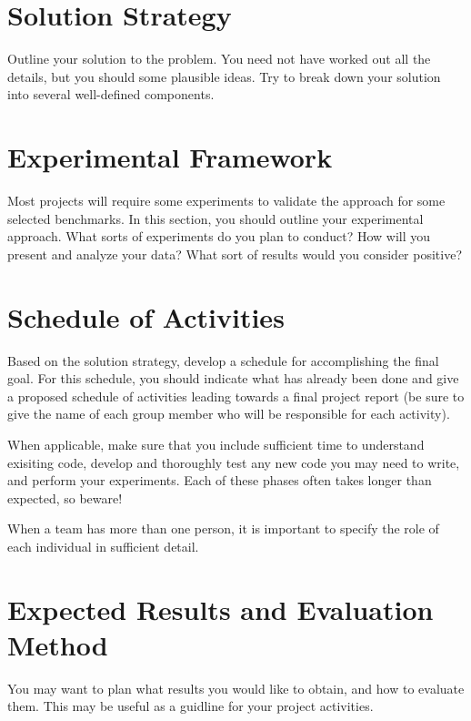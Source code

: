 \documentclass{article}
\begin{document}
\section{Solution Strategy}

Outline your solution to the problem.   You need not have worked out all
the details,  but you should some plausible ideas.   Try to break down
your solution into several well-defined components.

\section{Experimental Framework}

Most projects will require some experiments to validate the approach for
some selected benchmarks.  In this section, you should outline your
experimental approach.  What sorts of experiments do you plan to conduct?
How will you present and analyze your data?   What sort of results would
you consider positive?

\section{Schedule of Activities}

Based on the solution strategy, develop a schedule for accomplishing the
final goal.  For this schedule, you should indicate what has already been
done and give a proposed schedule of activities leading towards a final
project report (be sure to give the name of each group member who will be
responsible for each activity).

When applicable, make sure that you include sufficient time to understand
exisiting code, develop and thoroughly test any new code you may need to
write, and perform your experiments.  Each of these phases often takes
longer than expected, so beware!

When a team has more than one person, it is important to specify
the role of each individual in sufficient detail.

\section{Expected Results and Evaluation Method}

You may want to plan what results you would like to obtain, and how to
evaluate them.  This may be useful as a guidline for your project activities.



\end{document}
